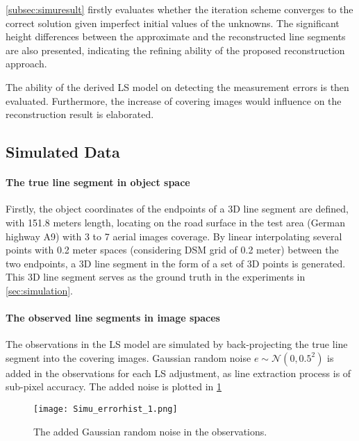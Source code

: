 \cref{subsec:simuresult} firstly evaluates whether the iteration scheme converges to the correct solution given imperfect initial values of the unknowns. The significant height differences between the approximate and the reconstructed line segments are also presented, indicating the refining ability of the proposed reconstruction approach.

The ability of the derived LS model on detecting the measurement errors is then evaluated. Furthermore, the increase of covering images would influence on the reconstruction result is elaborated.





\subsection{Simulated Data}
\label{subsec:simudata}

\paragraph{The true line segment in object space}
Firstly, the object coordinates of the endpoints of a 3D line segment are defined, with 151.8 meters length, locating on the road surface in the test area (German highway A9) with 3 to 7 aerial images coverage. By linear interpolating several points with 0.2 meter spaces (considering DSM grid of 0.2 meter) between the two endpoints, a 3D line segment in the form of a set of 3D points is generated. This 3D line segment serves as the ground truth in the experiments in \cref{sec:simulation}. 

\paragraph{The observed line segments in image spaces}
The observations in the LS model are simulated by back-projecting the true line segment into the covering images. Gaussian random noise $e\sim\mathcal{N}(0,0.5^2)$ is added in the observations for each LS adjustment, as line extraction process is of sub-pixel accuracy. The added noise is plotted in \cref{fig:noise}

\begin{figure}
  \centering
  \texttt{[image: Simu\_errorhist\_1.png]}
  \caption{\small The added Gaussian random noise in the observations.}
  \label{fig:noise}
\end{figure}

